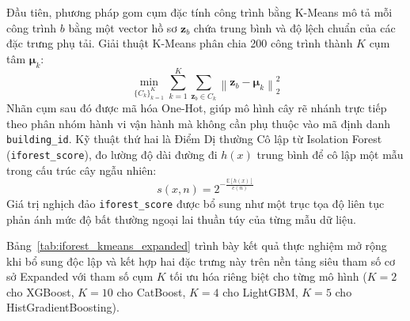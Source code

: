 Đầu tiên, phương pháp gom cụm đặc tính công trình bằng K-Means mô tả mỗi công trình $b$ bằng một vector hồ sơ $\mathbf{z}_b$ chứa trung bình và độ lệch chuẩn của các đặc trưng phụ tải. Giải thuật K-Means phân chia 200 công trình thành $K$ cụm tâm $\boldsymbol{\mu}_k$:
\begin{equation*}
    \min_{\{C_k\}_{k=1}^{K}} \sum_{k=1}^{K}\sum_{\mathbf{z}_b\in C_k} \left\|\mathbf{z}_b-\boldsymbol{\mu}_k\right\|_2^2
\end{equation*}
Nhãn cụm sau đó được mã hóa One-Hot, giúp mô hình cây rẽ nhánh trực tiếp theo phân nhóm hành vi vận hành mà không cần phụ thuộc vào mã định danh \texttt{building\_id}. Kỹ thuật thứ hai là Điểm Dị thường Cô lập từ Isolation Forest (\texttt{iforest\_score}), đo lường độ dài đường đi $h(x)$ trung bình để cô lập một mẫu trong cấu trúc cây ngẫu nhiên:
\begin{equation*}
    s(x,n)=2^{-\frac{\mathbb{E}[h(x)]}{c(n)}}
\end{equation*}
Giá trị nghịch đảo \texttt{iforest\_score} được bổ sung như một trục tọa độ liên tục phản ánh mức độ bất thường ngoại lai thuần túy của từng mẫu dữ liệu.

Bảng~\ref{tab:iforest_kmeans_expanded} trình bày kết quả thực nghiệm mở rộng khi bổ sung độc lập và kết hợp hai đặc trưng này trên nền tảng siêu tham số cơ sở Expanded với tham số cụm $K$ tối ưu hóa riêng biệt cho từng mô hình ($K=2$ cho XGBoost, $K=10$ cho CatBoost, $K=4$ cho LightGBM, $K=5$ cho HistGradientBoosting).

